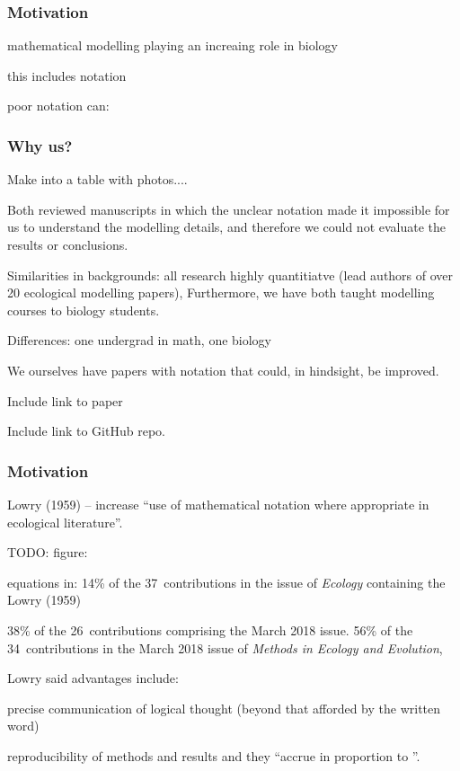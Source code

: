 \begin{frame}
\frametitle{Motivation}
\bi
\item mathematical modelling playing an increaing role in biology
\item {}
\item this includes notation
\item {}
\item poor notation can:
  \bi
  \item {}
  \item {}
  \item {}
  \item {}
  \ei
\ei
\end{frame}


\begin{frame}
\frametitle{Why us?}
Make into a table with photos....

Both reviewed manuscripts in which the unclear
notation made it impossible for us to understand the modelling details, and
therefore we could not evaluate the results or conclusions.

Similarities in backgrounds: all research highly quantitiatve
(lead authors of over 20 ecological modelling papers),
Furthermore, we have both taught modelling courses to biology students.

Differences: one undergrad in math, one biology

We ourselves have papers with notation that could, in hindsight, be improved.

Include link to paper

Include link to GitHub repo.
\end{frame}



\begin{frame}
\frametitle{Motivation}
Lowry (1959) -- increase ``use of mathematical notation
where appropriate in ecological literature''.

TODO: figure:

equations in:
 14\% of the 37~contributions in the issue of \emph{Ecology} containing the
 Lowry (1959)

38\% of the 26~contributions comprising the March 2018 issue.
56\% of the 34~contributions in the March 2018 issue of \emph{Methods in Ecology and Evolution},

Lowry said advantages include:
\bi
\item precise communication of logical thought (beyond that afforded by
  the written word)
\item reproducibility of methods and results
\ei
and they ``accrue in proportion to
''.
\end{frame}

